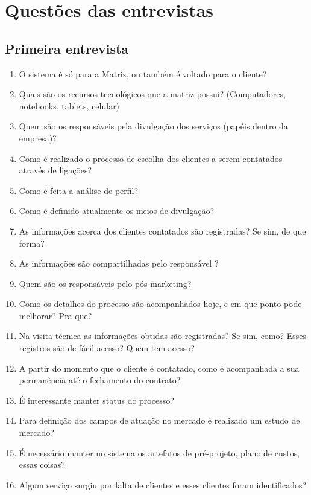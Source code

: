 \chapter{Questões das entrevistas}
\label{questionario}

\section{Primeira entrevista}

\begin{enumerate}
	\item O sistema é só para a Matriz, ou também é voltado para o cliente?
	\item Quais são os recursos tecnológicos que a matriz possui? (Computadores, notebooks, tablets, celular)
	\item Quem são os responsáveis pela divulgação dos serviços (papéis dentro da empresa)?
	\item Como é realizado o processo de escolha dos clientes a serem contatados através de ligações?
	\item Como é feita a análise de perfil?
	\item Como é definido atualmente os meios de divulgação?
 
	\item As informações acerca dos clientes contatados são registradas? Se sim, de que forma?
	\item As informações são compartilhadas pelo responsável ?
	\item Quem são os responsáveis pelo pós-marketing?
	\item Como os detalhes do processo são acompanhados hoje, e em que ponto pode melhorar? Pra que?
	\item Na visita técnica as informações obtidas são registradas? Se sim, como? Esses registros são de fácil acesso? Quem tem acesso?

	\item A partir do momento que o cliente é contatado, como é acompanhada a sua permanência até o fechamento do contrato?
	\item É interessante manter status do processo?
	\item Para definição dos campos de atuação no mercado é realizado um estudo de mercado?
	\item É necessário manter no sistema os artefatos de pré-projeto, plano de custos, essas coisas?
	\item Algum serviço surgiu por falta de clientes e esses clientes foram identificados?
\end{enumerate}

